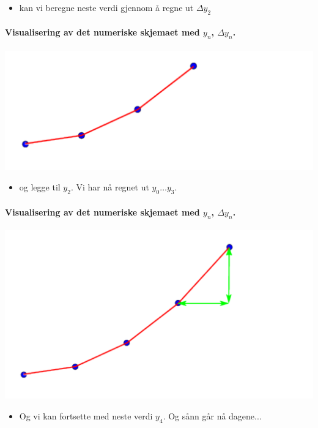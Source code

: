 \documentclass[%
oneside,                 %
final,                   %
10pt]{article}
\begin{document}
\begin{itemize}
\item kan vi beregne neste verdi gjennom å regne ut $\Delta y_2$
\end{itemize}

\noindent

\paragraph{Visualisering av det numeriske skjemaet med $y_n$, $\Delta y_n$.}
\centerline{\includegraphics[width=0.9\linewidth]{fig/diskret_funksjon_3.pdf}}



\begin{itemize}
\item og legge til $y_2$. Vi har nå regnet ut $y_0 \ldots y_3$.
\end{itemize}

\noindent

\paragraph{Visualisering av det numeriske skjemaet med $y_n$, $\Delta y_n$.}
\centerline{\includegraphics[width=0.9\linewidth]{fig/diskret_funksjon_5.pdf}}



\begin{itemize}
\item Og vi kan fortsette med neste verdi $y_4$. Og sånn går nå dagene...
\end{itemize}
\end{document}
